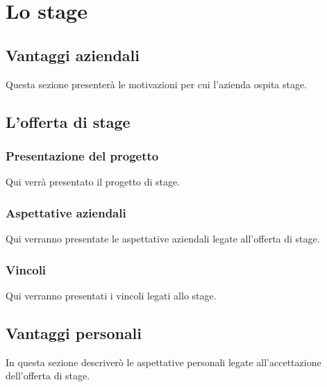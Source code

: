 

\chapter{Lo stage}
\label{cap:stage}

\section{Vantaggi aziendali}
Questa sezione presenterà le motivazioni per cui l'azienda ospita stage.

\section{L'offerta di stage}

	\subsection{Presentazione del progetto}
	Qui verrà presentato il progetto di stage.
	
	\subsection{Aspettative aziendali}
	Qui verranno presentate le aspettative aziendali legate all'offerta di stage.
	
	\subsection{Vincoli}
	Qui verranno presentati i vincoli legati allo stage.

\section{Vantaggi personali}
In questa sezione descriverò le aspettative personali legate all'accettazione dell'offerta di stage.
